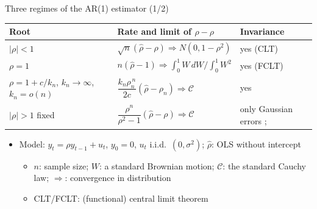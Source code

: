 \begin{frame}{Three regimes of the AR(1) estimator (1/2)}
\itemsize{\small}
{\renewcommand{\arraystretch}{2.0}\begin{center}
\footnotesize
\begin{tabular}{@{}lll@{}}
\toprule
\textbf{Root} & \textbf{Rate and limit of} $\hat\rho - \rho$ & \textbf{Invariance} \\
\midrule
$|\rho| < 1$ & $\sqrt n(\hat\rho - \rho) \Rightarrow N(0, 1 - \rho^2)$ & yes (CLT) \\
$\rho = 1$ & $n(\hat\rho - 1) \Rightarrow \int_0^1 W\,dW \big/ \int_0^1 W^2$ & yes (FCLT) \\
$\rho = 1 + c/k_n$, $k_n \to \infty$, $k_n = o(n)$ & $\dfrac{k_n\rho_n^{\,n}}{2c}(\hat\rho - \rho_n) \Rightarrow \mathcal C$ & yes {} \\
$|\rho| > 1$ fixed & $\dfrac{\rho^n}{\rho^2 - 1}(\hat\rho - \rho) \Rightarrow \mathcal C$ & only Gaussian errors ; {} \\
\bottomrule
\end{tabular}
\end{center}
}\begin{itemize}
    \item Model: $y_t = \rho y_{t-1} + u_t$, $y_0 = 0$, $u_t$ i.i.d.\ $(0, \sigma^2)$; $\hat\rho$: OLS without intercept
    \begin{itemize}
        \item $n$: sample size; $W$: a standard Brownian motion; $\mathcal C$: the standard Cauchy law; $\Rightarrow$: convergence in distribution
        \item CLT/FCLT: (functional) central limit theorem
    \end{itemize}
\end{itemize}
\end{frame}

